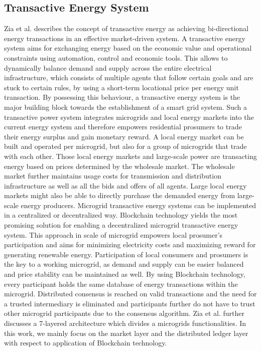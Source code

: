 \documentclass[runningheads]{llncs}
\begin{document}
\subsection{Transactive Energy System}
Zia et al. \cite{zia_microgrid_te} describes the concept of transactive energy as achieving bi-directional energy transactions in an effective market-driven system. A transactive energy system aims for exchanging energy based on the economic value and operational constraints using automation, control and economic tools. This allows to dynamically balance demand and supply across the entire electrical infrastructure, which consists of multiple agents that follow certain goals and are stuck to certain rules, by using a short-term locational price per energy unit transaction. By possessing this behaviour, a transactive energy system is the major building block towards the establishment of a smart grid system. \newline
Such a transactive power system integrates microgrids and local energy markets into the current energy system and therefore empowers residential prosumers to trade their energy surplus and gain monetary reward. A local energy market can be built and operated per microgrid, but also for a group of microgrids that trade with each other. Those local energy markets and large-scale power are transacting energy based on prices determined by the wholesale market. The wholesale market further maintains usage costs for transmission and distribution infrastructure as well as all the bids and offers of all agents. Large local energy markets might also be able to directly purchase the demanded energy from large-scale energy producers. \cite{zia_microgrid_te}
Microgrid transactive energy systems can be implemented in a centralized or decentralized way. Blockchain technology yields the most promising solution for enabling a decentralized microgrid transactive energy system. This approach in scale of microgrid empowers local prosumer’s participation and aims for minimizing electricity costs and maximizing reward for generating renewable energy. Participation of local consumers and prosumers is the key to a working microgrid, as demand and supply can be easier balanced and price stability can be maintained as well. By using Blockchain technology, every participant holds the same database of energy transactions within the microgrid. Distributed consensus is reached on valid transactions and the need for a trusted intermediary is eliminated and participants further do not have to trust other microgrid participants due to the consensus algorithm.
Zia et al. \cite{zia_microgrid_te} further discusses a 7-layered architecture which divides a microgrids functionalities. In this work, we mainly focus on the market layer and the distributed ledger layer with respect to application of Blockchain technology.
\end{document}

